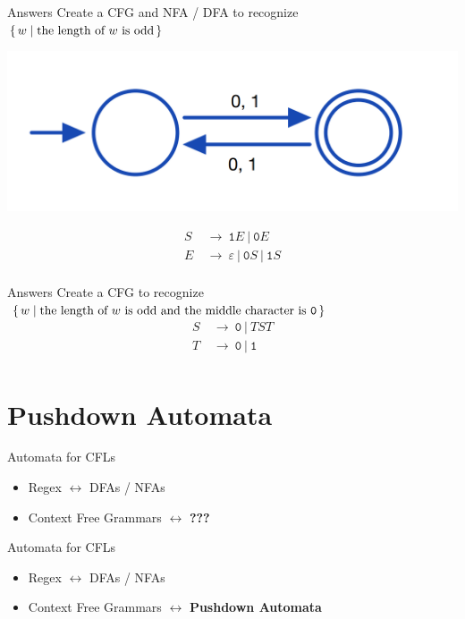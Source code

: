 \documentclass[aspectratio=169]{beamer}
\begin{document}
\begin{frame}{Answers}
    Create a CFG and NFA / DFA to recognize $\set{w | \text{the length of } w \text{ is odd}}$
    \begin{center}
        \includegraphics[scale=0.30]{images/odd.png}
    \end{center}
    {
    \Large
    \begin{align*}
        S ~&\to~ \texttt{1}E ~|~ \texttt{0}E \\
        E ~&\to~ \varepsilon ~|~ \texttt{0}S ~|~ \texttt{1}S  \\
    \end{align*}
    }
\end{frame}

\begin{frame}{Answers}
    Create a CFG to recognize $\set{w | \text{the length of } w \text{ is odd and the middle character is } \texttt{0}}$
    {
    \Large
    \begin{align*}
        S ~&\to~ \texttt{0} ~|~ TST \\
        T ~&\to~  \texttt{0} ~|~ \texttt{1} \\
    \end{align*}
    }
\end{frame}

\section{Pushdown Automata}
\frame{\sectionpage}

\begin{frame}{Automata for CFLs}
    \begin{itemize}
        \item {\large Regex $\leftrightarrow$ DFAs / NFAs} \pause
        \item {\large Context Free Grammars $\leftrightarrow$ \textbf{???} }
    \end{itemize}
\end{frame}

\begin{frame}{Automata for CFLs}
    \begin{itemize}
        \item {\large Regex $\leftrightarrow$ DFAs / NFAs}
        \item {\large Context Free Grammars $\leftrightarrow$ \textbf{Pushdown Automata}}
    \end{itemize}
\end{frame}
\end{document}
